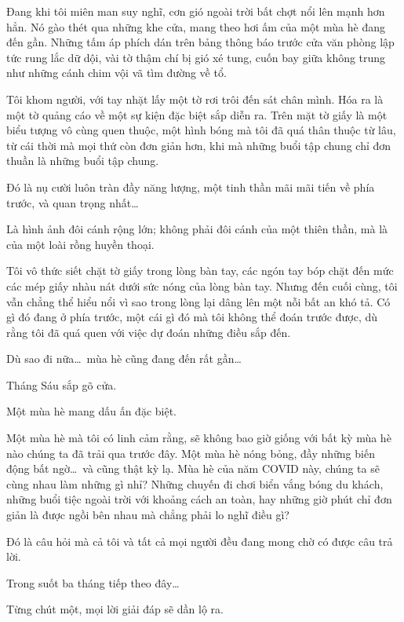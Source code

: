 \documentclass[../main.tex]{subfiles}
\begin{document}
Đang khi tôi miên man suy nghĩ, cơn gió ngoài trời bất chợt nổi lên mạnh hơn hẳn. Nó gào thét qua những khe cửa, mang theo hơi ấm của một mùa hè đang đến gần. Những tấm áp phích dán trên bảng thông báo trước cửa văn phòng lập tức rung lắc dữ dội, vài tờ thậm chí bị gió xé tung, cuốn bay giữa không trung như những cánh chim vội vã tìm đường về tổ.

Tôi khom người, với tay nhặt lấy một tờ rơi trôi đến sát chân mình. Hóa ra là một tờ quảng cáo về một sự kiện đặc biệt sắp diễn ra. Trên mặt tờ giấy là một biểu tượng vô cùng quen thuộc, một hình bóng mà tôi đã quá thân thuộc từ lâu, từ cái thời mà mọi thứ còn đơn giản hơn, khi mà những buổi tập chung chỉ đơn thuần là những buổi tập chung.

Đó là nụ cười luôn tràn đầy năng lượng, một tinh thần mãi mãi tiến về phía trước, và quan trọng nhất\dots

Là hình ảnh đôi cánh rộng lớn; không phải đôi cánh của một thiên thần, mà là của một loài rồng huyền thoại.

Tôi vô thức siết chặt tờ giấy trong lòng bàn tay, các ngón tay bóp chặt đến mức các mép giấy nhàu nát dưới sức nóng của lòng bàn tay. Nhưng đến cuối cùng, tôi vẫn chẳng thể hiểu nổi vì sao trong lòng lại dâng lên một nỗi bất an khó tả. Có gì đó đang ở phía trước, một cái gì đó mà tôi không thể đoán trước được, dù rằng tôi đã quá quen với việc dự đoán những điều sắp đến.

Dù sao đi nữa\dots\ mùa hè cũng đang đến rất gần\dots

Tháng Sáu sắp gõ cửa.

Một mùa hè mang dấu ấn đặc biệt.

Một mùa hè mà tôi có linh cảm rằng, sẽ không bao giờ giống với bất kỳ mùa hè nào chúng ta đã trải qua trước đây. Một mùa hè nóng bỏng, đầy những biến động bất ngờ\dots\ và cũng thật kỳ lạ. Mùa hè của năm COVID này, chúng ta sẽ cùng nhau làm những gì nhỉ? Những chuyến đi chơi biển vắng bóng du khách, những buổi tiệc ngoài trời với khoảng cách an toàn, hay những giờ phút chỉ đơn giản là được ngồi bên nhau mà chẳng phải lo nghĩ điều gì?

Đó là câu hỏi mà cả tôi và tất cả mọi người đều đang mong chờ có được câu trả lời.

Trong suốt ba tháng tiếp theo đây\dots

Từng chút một, mọi lời giải đáp sẽ dần lộ ra.
\end{document}
